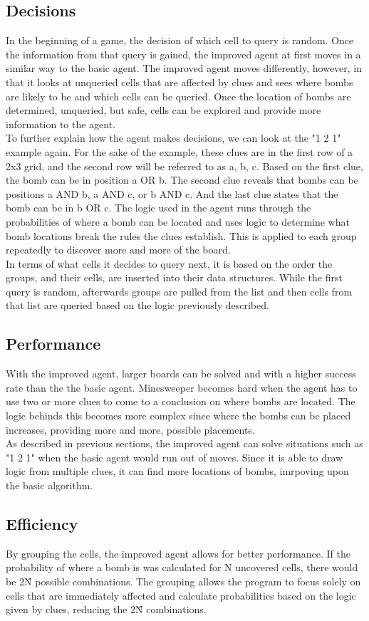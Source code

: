 \documentclass[13pt]{report}
\begin{document}
\subsection*{Decisions}
In the beginning of a game, the decision of which cell to query is random. Once the information from that query is gained, the improved agent at first moves in a similar way to the basic agent. The improved agent moves differently, however, in that it looks at unqueried cells that are affected by clues and sees where bombs are likely to be and which cells can be queried. Once the location of bombs are determined, unqueried, but safe, cells can be explored and provide more information to the agent.\\
To further explain how the agent makes decisions, we can look at the "1 2 1" example again. For the sake of the example, these clues are in the first row of a 2x3 grid, and the second row will be referred to as a, b, c. Based on the first clue, the bomb can be in position a OR b. The second clue reveals that bombs can be positions a AND b, a AND c, or b AND c. And the last clue states that the bomb can be in b OR c. The logic used in the agent runs through the probabilities of where a bomb can be located and uses logic to determine what bomb locations break the rules the clues establish. This is applied to each group repeatedly to discover more and more of the board.\\
In terms of what cells it decides to query next, it is based on the order the groups, and their cells, are inserted into their data structures. While the first query is random, afterwards groups are pulled from the list and then cells from that list are queried based on the logic previously described.

\subsection*{Performance}
With the improved agent, larger boards can be solved and with a higher success rate than the the basic agent. Minesweeper becomes hard when the agent has to use two or more clues to come to a conclusion on where bombs are located. The logic behinds this becomes more complex since where the bombs can be placed increases, providing more and more, possible placements.\\
As described in previous sections, the improved agent can solve situations such as "1 2 1" when the basic agent would run out of moves. Since it is able to draw logic from multiple clues, it can find more locations of bombs, imrpoving upon the basic algorithm.

\subsection*{Efficiency}
By grouping the cells, the improved agent allows for better performance. If the probability of where a bomb is was calculated for N uncovered cells, there would be 2\^N possible combinations. The grouping allows the program to focus solely on cells that are immediately affected and calculate probabilities based on the logic given by clues, reducing the 2\^N combinations.
\end{document}

